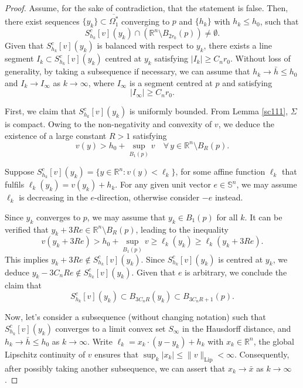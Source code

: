 \documentclass[11pt]{amsart}
\theoremstyle{plain}
\newcommand{\0}{\textbf{0}}
\numberwithin{equation}{section}
\numberwithin{equation}{section}
\numberwithin{figure}{section}
\begin{document}
\begin{proof}
Assume, for the sake of contradiction, that the statement is false. Then, there exist sequences \( \{y_k\} \subset \overline{\Omega^{*}_1} \) converging to \( p \) and \( \{h_k\} \) with \( h_k \leq h_0 \), such that 
\begin{equation}\label{cseg1}
S_{h_k}^c[v](y_k) \cap \left(\mathbb{R}^n \setminus B_{2r_0}(p)\right) \neq \emptyset.
\end{equation}
Given that \( S_{h_k}^c[v](y_k) \) is balanced with respect to \( y_k \), there exists a line segment \( I_k \subset S_{h_k}^c[v](y_k) \) centred at \( y_k \) satisfying \( |I_k| \geq C_n r_0 \).
Without loss of generality, by taking a subsequence if necessary, we can assume that \( h_k \to \bar{h} \leq h_0 \) and \( I_k \to I_\infty \) as \( k \to \infty \), where \( I_\infty \) is a segment centred at \( p \) and satisfying
\begin{equation}\label{cseg2}
|I_\infty| \geq C_n r_0.
\end{equation}

First, we claim that $S_{h_k}^c[v](y_k)$ is uniformly bounded. 
From Lemma \ref{sc111}, $\Sigma$ is compact. 
Owing to the non-negativity and convexity of $v$, we deduce the existence of a large constant \( R > 1 \) satisfying
\[ v(y) > h_0 + \sup_{B_1(p)} v \quad \forall\, y \in \mathbb{R}^n \setminus B_R(p). \]

Suppose \( S_{h_k}^c[v](y_k) = \{y \in \mathbb{R}^n : v(y) < \ell_k\} \), for some affine function \( \ell_k \)  that fulfils \( \ell_k(y_k) = v(y_k) + h_k \). For any given unit vector \( e \in \mathbb{S}^n \), we may assume $\ell_k$ is decreasing in the $e$-direction, otherwise consider $-e$ instead.

Since \( y_k \) converges to \( p\), we may assume that \(y_k\in B_1(p) \) for all $k.$
It can be verified that \( y_k + 3Re \in \mathbb{R}^n \setminus B_R(p) \), leading to the inequality
\[ v(y_k + 3Re) > h_0 + \sup_{B_1(p)} v \geq \ell_k(y_k)\geq \ell_k(y_k+3Re). \]
This implies \( y_k + 3Re \notin S_{h_k}^c[v](y_k) \). 
Since \( S_{h_k}^c[v](y_k) \) is centred at \( y_k \), we deduce \( y_k - 3C_nRe \notin S_{h_k}^c[v](y_k) \). Given that \( e \) is arbitrary, we conclude the claim that 
\begin{equation} 
	S_{h_k}^c[v](y_k) \subset B_{3C_nR}(y_k) \subset B_{3C_nR+1}(p).
\end{equation}

Now, let's consider a subsequence (without changing notation) such that \( S_{h_k}^c[v](y_k) \) converges to a limit convex set \( S_\infty \) in the Hausdorff distance, and $h_k\to\bar h\leq h_0$ as $k\to\infty$. 
Write \( \ell_k = x_k \cdot (y - y_k) + h_k \) with \( x_k \in \mathbb{R}^n \), the global Lipschitz continuity of \( v \) ensures that \( \sup_k |x_k| \leq \|v\|_{\text{Lip}} < \infty \). Consequently, after possibly taking another subsequence, we can assert that \( x_k \to \bar{x} \) as \( k \to \infty \).



\end{proof}
\end{document}
